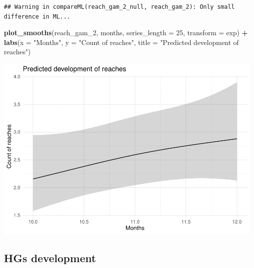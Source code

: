 \documentclass[]{article}
\newenvironment{Shaded}{\begin{snugshade}}{\end{snugshade}}
\newcommand{\DataTypeTok}[1]{\textcolor[rgb]{0.13,0.29,0.53}{#1}}
\newcommand{\DecValTok}[1]{\textcolor[rgb]{0.00,0.00,0.81}{#1}}
\newcommand{\FloatTok}[1]{\textcolor[rgb]{0.00,0.00,0.81}{#1}}
\newcommand{\KeywordTok}[1]{\textcolor[rgb]{0.13,0.29,0.53}{\textbf{#1}}}
\newcommand{\NormalTok}[1]{#1}
\newcommand{\OperatorTok}[1]{\textcolor[rgb]{0.81,0.36,0.00}{\textbf{#1}}}
\newcommand{\StringTok}[1]{\textcolor[rgb]{0.31,0.60,0.02}{#1}}
\begin{document}
\begin{verbatim}
## Warning in compareML(reach_gam_2_null, reach_gam_2): Only small difference in ML...
\end{verbatim}

\begin{Shaded}
\begin{Highlighting}[]
\KeywordTok{plot_smooths}\NormalTok{(reach_gam_}\DecValTok{2}\NormalTok{, months, }\DataTypeTok{series_length =} \DecValTok{25}\NormalTok{, }\DataTypeTok{transform =}\NormalTok{ exp) }\OperatorTok{+}
\StringTok{  }\KeywordTok{labs}\NormalTok{(}\DataTypeTok{x =} \StringTok{"Months"}\NormalTok{, }\DataTypeTok{y =} \StringTok{"Count of reaches"}\NormalTok{, }\DataTypeTok{title =} \StringTok{"Predicted development of reaches"}\NormalTok{)}
\end{Highlighting}
\end{Shaded}

\includegraphics{supplement_files/figure-latex/reach-gam-2-plot-1.pdf}

\hypertarget{hgs-development}{%
\subsection{HGs development}\label{hgs-development}}

\begin{Shaded}
\end{Shaded}
\end{document}
